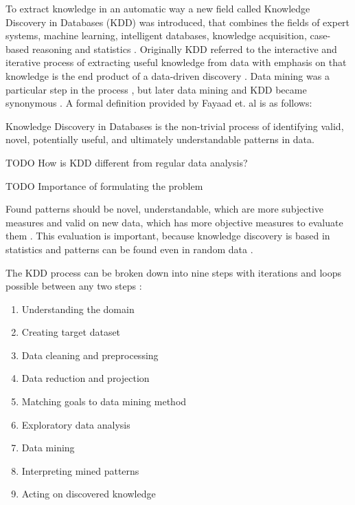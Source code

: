 \documentclass[utf8,english]{gradu3}
\begin{document}
To extract knowledge in an automatic way a new field called Knowledge Discovery in Databases (KDD) was introduced, that combines the fields of expert systems, machine learning, intelligent databases, knowledge acquisition, case-based reasoning and statistics \parencite{piatetsky-shapiroKnowledgeDiscoveryReal1990}. Originally KDD referred to the interactive and iterative process of extracting useful knowledge from data with emphasis on that knowledge is the end product of a data-driven discovery \parencite{fayyadKnowledgeDiscoveryData1996}. Data mining was a particular step in the process \parencite{fayyadKnowledgeDiscoveryData1996}, but later data mining and KDD became synonymous \parencite{piatetsky-shapiroKnowledgeDiscoveryDatabases2000}. A formal definition provided by Fayaad et. al \parencite*{fayyadKnowledgeDiscoveryData1996} is as follows:
\begin{displayquote}
Knowledge Discovery in Databases is the non-trivial process of identifying valid, novel, potentially useful, and ultimately understandable patterns in data.
\end{displayquote}

TODO How is KDD different from regular data analysis?

TODO Importance of formulating the problem

Found patterns should be novel, understandable, which are more subjective measures and valid on new data, which has more objective measures to evaluate them \parencite{fayyadKnowledgeDiscoveryData1996}. This evaluation is important, because knowledge discovery is based in statistics and patterns can be found even in random data \parencite{fayyadDataMiningKnowledge1996}.


The KDD process can be broken down into nine steps with iterations and loops possible between any two steps \parencite{fayyadKDDProcessExtracting1996,fayyadKnowledgeDiscoveryData1996,fayyadDataMiningKnowledge1996}:

\begin{enumerate}
  \item Understanding the domain
  \item Creating target dataset
  \item Data cleaning and preprocessing
  \item Data reduction and projection
  \item Matching goals to data mining method
  \item Exploratory data analysis
  \item Data mining
  \item Interpreting mined patterns
  \item Acting on discovered knowledge
\end{enumerate}
\end{document}
